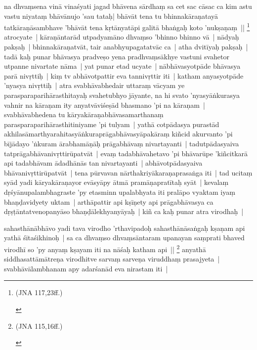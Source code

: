 \documentclass[article,a4paper]{memoir}
\begin{document}
	  \pstart na dhvaṃsena vinā\- vinaśyati jagad bhā\-vena sā\-rdhaṃ sa cet sac cā\-sac ca kim astu vastu niyataṃ bhā\-vā\-nujo 'sau tataḥ| bhā\-vā\-t tena tu bhinnakā\-raṇatayā\- tatkā\-raṇā\-sambhave 'bhā\-vā\-t tena kṛtā\-nyatā\-pi galitā\- bhaṅgaḥ koto 'nukṣaṇaṃ || \footnote{\begin{english}(JNA 117,23ff.)\end{english}} \label{thakur75-120.22} atrocyate | kā\-raṇā\-ntarā\-d utpadyamā\-no dhvaṃso 'bhinno bhinno vā\- | \label{thakur75-120.22a} nā\-dyaḥ pakṣaḥ | bhinnakā\-raṇatvā\-t, tair anabhyupagatatvā\-c ca | atha dvitī\-yaḥ pakṣaḥ | tadā\- kaḥ punar bhā\-vasya pradveṣo yena pradhvaṃsā\-khye vastuni svahetor utpanne nivartate nā\-ma | \label{thakur75-120.25} yat punar etad ucyate | nā\-bhā\-vasyotpā\-de bhā\-vasya parā\- nivṛttiḥ | kiṃ tv abhā\-votpattir eva tannivṛttir iti | katham anyasyotpā\-de 'nyasya nivṛttiḥ | atra svabhā\-vabhedair uttaraṃ vā\-cyam ye parasparaparihā\-rasthitayaḥ svahetubhyo jā\-yante, na hi svato 'nyasyā\-ṅkurasya vahnir na kā\-raṇam ity anyatvā\-viśeṣā\-d bhasmano 'pi na kā\-raṇam | svabhā\-vabhedena tu kā\-ryakā\-raṇabhā\-vasamarthanaṃ parasparaparihā\-rasthitiniyame 'pi tulyam | yathā\- cotpā\-dasya purastā\-d akhilasā\-marthyarahitasyā\-ṅkuraprā\-gabhā\-vasyā\-pakā\-raṃ kiñcid akurvanto 'pi bī\-jā\-dayo 'ṅkuram ā\-rabhamā\-ṇā\-ḥ prā\-gabhā\-vaṃ nivartayanti | tadutpā\-dasyaiva tatprā\-gabhā\-vanivṛttirū\-patvā\-t | evaṃ tadabhā\-vahetavo 'pi bhā\-varū\-pe 'kiñcitkarā\- api tadabhā\-vam ā\-dadhā\-nā\-s tan nivartayanti | abhā\-votpā\-dasyaiva bhā\-vanivṛttirū\-patvā\-t | tena pū\-rvavan nā\-rthakriyā\-karaṇaprasaṅga iti | \label{thakur75-121.2} tad ucitaṃ syā\-d yadi kā\-ryakā\-raṇayor evā\-syā\-py ā\-tmā\- pramā\-ṇapratī\-taḥ syā\-t | kevalaṃ dṛśyā\-nupalambhagraste 'py etasminn upalabhyata iti pralā\-po vyaktam iyaṃ bhaṇḍavidyety uktam | \label{thakur75-121.4} arthā\-pattir api kṣī\-ṇety api prā\-gabhā\-vasya ca dṛṣṭā\-ntatvenopanyā\-so bhaṇḍā\-lekhyanyā\-yaḥ | \label{thakur75-121.6} kiñ ca kaḥ punar atra virodhaḥ |
	\pend
      

	  \pstart sahasthā\-nā\-bhā\-vo yadi tava virodho 'rthavipadoḥ sahasthā\-nā\-saṅgaḥ kṣaṇam api yathā\- śī\-taśikhinoḥ | sa ca dhvaṃso dhvaṃsā\-ntaram upanayan saṃprati bhaved virodhī\- so 'py anyaṃ kṣayam iti na nā\-śaḥ katham api || \footnote{\begin{english}(JNA 115,16ff.)\end{english}} \label{thakur75-121.11} anyathā\- siddhasattā\-mā\-treṇa virodhitve sarvaṃ sarveṇa viruddhaṃ prasajyeta | svabhā\-vā\-lambhanam apy adarśanā\-d eva nirastam iti |
	\pend
      
\end{document}
